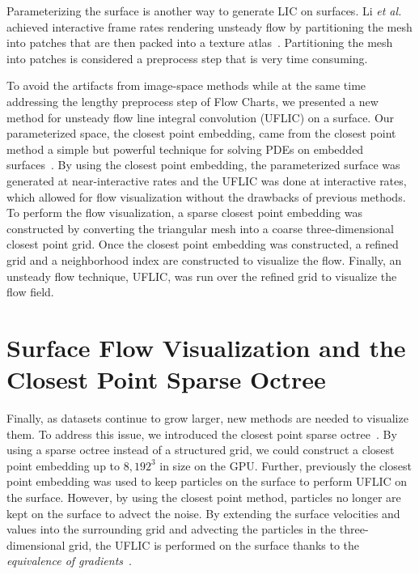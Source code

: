 Parameterizing the surface is another way to generate LIC on surfaces. Li \textit{et al.} achieved interactive frame rates rendering unsteady flow by partitioning the mesh into patches that are then packed into a texture atlas~\cite{10.1109/TVCG.2008.58}. Partitioning the mesh into patches is considered a preprocess step that is very time consuming.

To avoid the artifacts from image-space methods while at the same time addressing the lengthy preprocess step of Flow Charts, we presented a new method for unsteady flow line integral convolution (UFLIC) on a surface. Our parameterized space, the closest point embedding, came from the closest point method a simple but powerful technique for solving PDEs on embedded surfaces~\cite{DBLP:journals/jcphy/RuuthM08}. By using the closest point embedding, the parameterized surface was generated at near-interactive rates and the UFLIC was done at interactive rates, which allowed for flow visualization without the drawbacks of previous methods. To perform the flow visualization, a sparse closest point embedding was constructed by converting the triangular mesh into a coarse three-dimensional closest point grid. Once the closest point embedding was constructed, a refined grid and a neighborhood index are constructed to visualize the flow. Finally, an unsteady flow technique, UFLIC, was run over the refined grid to visualize the flow field.

\section{Surface Flow Visualization and the Closest \newline Point Sparse Octree}
Finally, as datasets continue to grow larger, new methods are needed to visualize them. To address this issue, we introduced the closest point sparse octree~\cite{SCI:Kim2016a}. By using a sparse octree instead of a structured grid, we could construct a closest point embedding up to $8,192^3$ in size on the GPU. Further, previously the closest point embedding was used to keep particles on the surface to perform UFLIC on the surface. However, by using the closest point method, particles no longer are kept on the surface to advect the noise. By extending the surface velocities and values into the surrounding grid and advecting the particles in the three-dimensional grid, the UFLIC is performed on the surface thanks to the \emph{equivalence of gradients}~\cite{DBLP:journals/jcphy/RuuthM08}.

